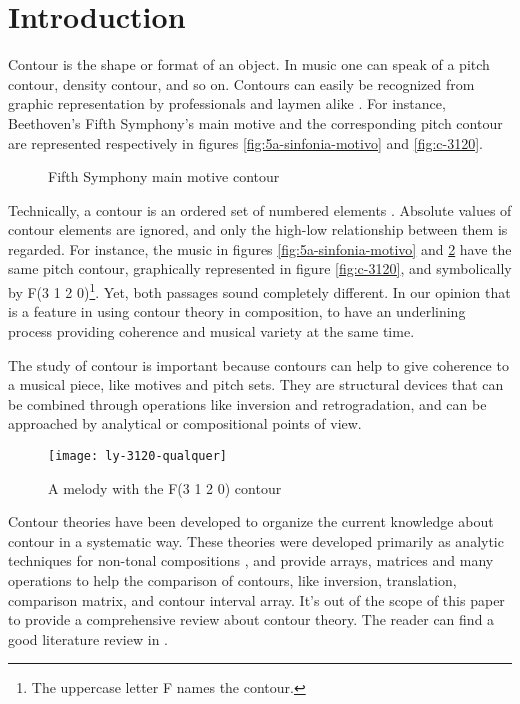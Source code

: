 \section{Introduction}
\label{sec:introduction}

Contour is the shape or format of an object. In music one can speak of
a pitch contour, density contour, and so on. Contours can easily be
recognized from graphic representation by professionals and laymen
alike \cite{marvin88:generalized}. For instance, Beethoven's Fifth
Symphony's main motive and the corresponding pitch contour are
represented respectively in figures \ref{fig:5a-sinfonia-motivo} and
\ref{fig:c-3120}.

\begin{figure}[h!]
  \centering

  \subfloat[Contour F(3 1 2 0)]{
    \texttt{[image: c-3120]}
    \label{fig:c-3120}
  }
  \caption{Fifth Symphony main motive contour}
  \label{fig:5a-sinfonia}
\end{figure}

Technically, a contour is an ordered set of numbered elements
\cite{morris93:directions}. Absolute values of contour elements are
ignored, and only the high-low relationship between them is regarded.
For instance, the music in figures \ref{fig:5a-sinfonia-motivo} and
\ref{fig:ly-3120} have the same pitch contour, graphically represented
in figure \ref{fig:c-3120}, and symbolically by F(3 1 2
0)\footnote{The uppercase letter F names the contour.}. Yet, both
passages sound completely different. In our opinion that is a feature
in using contour theory in composition, to have an underlining process
providing coherence and musical variety at the same time.

The study of contour is important because contours can help to give
coherence to a musical piece, like motives and pitch sets. They are
structural devices that can be combined through operations like
inversion and retrogradation, and can be approached by analytical or
compositional points of view.

\begin{figure}[h!]
  \centering
  \texttt{[image: ly-3120-qualquer]}
  \caption{A melody with the F(3 1 2 0) contour}
  \label{fig:ly-3120}
\end{figure}

Contour theories
\cite{friedmann85:methodology,friedmann87:response,morris87:composition,morris93:directions,marvin.ea87:relating,marvin88:generalized,polansky.ea92:possible,quinn97:fuzzy,clifford95:contour,beard03:contour}
have been developed to organize the current knowledge about contour in
a systematic way. These theories were developed primarily as analytic
techniques for non-tonal compositions \cite{beard03:contour}, and
provide arrays, matrices and many operations to help the comparison of
contours, like inversion, translation, comparison matrix, and contour
interval array. It's out of the scope of this paper to provide a
comprehensive review about contour theory. The reader can find a good
literature review in \cite{beard03:contour}.

